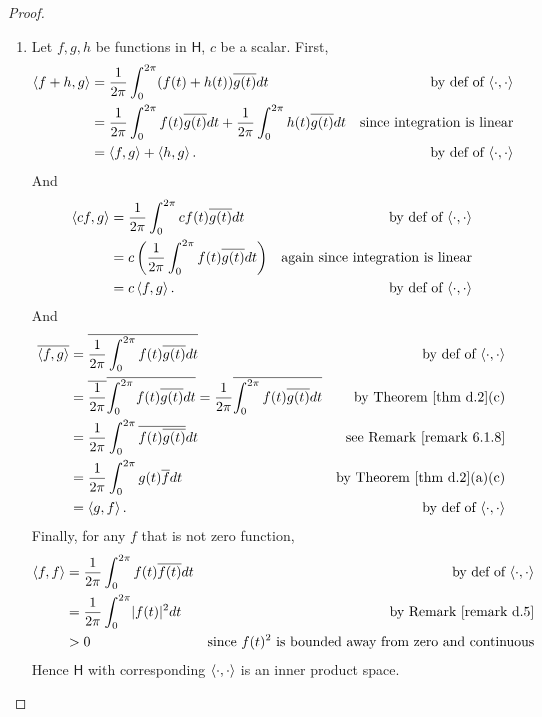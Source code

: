\begin{proof} \ 

\begin{enumerate}
\item
Let \(f, g, h\) be functions in \(\textsf{H}\), \(c\) be a scalar.
First,
\begin{align*}
    \left< f + h, g \right> & = \frac{1}{2\pi} \int_{0}^{2\pi} (f(t) + h(t)) \overline{g(t)} d t & \text{by def of \(\left<\cdot, \cdot \right>\)} \\
    & = \frac{1}{2 \pi} \int_{0}^{2 \pi} f(t) \overline{g(t)} d t + \frac{1}{2 \pi} \int_{0}^{2 \pi} h(t) \overline{g(t)} d t & \text{since integration is linear} \\
    & = \left< f, g \right> + \left< h, g \right>. & \text{by def of \(\left<\cdot, \cdot \right>\)}
\end{align*}
And
\begin{align*}
    \left< c f, g \right> & = \frac{1}{2 \pi} \int_{0}^{2 \pi} c f(t) \overline{g(t)} d t & \text{by def of \(\left<\cdot, \cdot \right>\)} \\
    & = c\left(\frac{1}{2 \pi} \int_{0}^{2 \pi} f(t) \overline{g(t)} d t \right) & \text{again since integration is linear} \\
    & = c \left< f, g \right>. & \text{by def of \(\left<\cdot, \cdot \right>\)}
\end{align*}
And
\begin{align*}
    \conjugatet{\LG f, g \RG} & = \conjugatet{\frac{1}{2 \pi} \int_{0}^{2 \pi} f(t) \conjugatet{g(t)} d t} & \text{by def of \(\InnerOp\)} \\
        & = \conjugatet{\frac{1}{2 \pi}} \conjugatet{\int_{0}^{2 \pi} f(t) \conjugatet{g(t)} d t} = \frac{1}{2 \pi} \conjugatet{\int_{0}^{2 \pi} f(t) \conjugatet{g(t)} d t} & \text{by \THM{d.2}(c)} \\
        & = \frac{1}{2 \pi} \int_{0}^{2 \pi} \overline{f(t) \conjugatet{g(t)}} d t & \text{see \RMK{6.1.8}} \\
        & = \frac{1}{2 \pi} \int_{0}^{2 \pi} g(t) \conjugatet{f} d t & \text{by \THM{d.2}(a)(c)} \\
        & = \LG g, f \RG. & \text{by def of \(\InnerOp\)}
\end{align*}
Finally, for any \(f\) that is not zero function,
\begin{align*}
    \LG f, f \RG & = \frac{1}{2 \pi} \int_{0}^{2 \pi} f(t) \conjugatet{f(t)} d t & \text{by def of \(\InnerOp\)} \\
        & = \frac{1}{2 \pi} \int_{0}^{2 \pi} \abs{f(t)}^2 d t & \text{by \RMK{d.5}} \\
        & > 0 & \text{since \(f(t)^2\) is bounded away from zero and continuous}
\end{align*}
Hence \(\textsf{H}\) with corresponding \(\left< \cdot, \cdot \right>\) is an inner product space.


\end{enumerate}
\end{proof}
